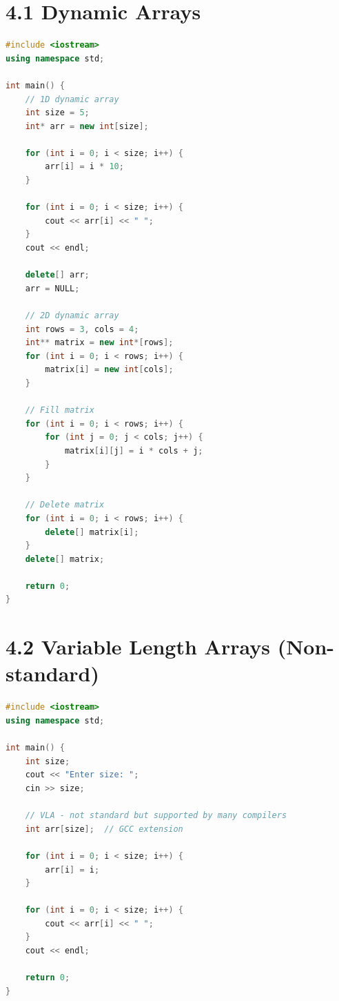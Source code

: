 \hypertarget{dynamic-arrays}{%
\section{4.1 Dynamic Arrays}\label{dynamic-arrays}}

\begin{lstlisting}[language={C++}]
#include <iostream>
using namespace std;

int main() {
    // 1D dynamic array
    int size = 5;
    int* arr = new int[size];
    
    for (int i = 0; i < size; i++) {
        arr[i] = i * 10;
    }
    
    for (int i = 0; i < size; i++) {
        cout << arr[i] << " ";
    }
    cout << endl;
    
    delete[] arr;
    arr = NULL;
    
    // 2D dynamic array
    int rows = 3, cols = 4;
    int** matrix = new int*[rows];
    for (int i = 0; i < rows; i++) {
        matrix[i] = new int[cols];
    }
    
    // Fill matrix
    for (int i = 0; i < rows; i++) {
        for (int j = 0; j < cols; j++) {
            matrix[i][j] = i * cols + j;
        }
    }
    
    // Delete matrix
    for (int i = 0; i < rows; i++) {
        delete[] matrix[i];
    }
    delete[] matrix;
    
    return 0;
}
\end{lstlisting}

\hypertarget{variable-length-arrays-non-standard}{%
\section{4.2 Variable Length Arrays
(Non-standard)}\label{variable-length-arrays-non-standard}}

\begin{lstlisting}[language={C++}]
#include <iostream>
using namespace std;

int main() {
    int size;
    cout << "Enter size: ";
    cin >> size;
    
    // VLA - not standard but supported by many compilers
    int arr[size];  // GCC extension
    
    for (int i = 0; i < size; i++) {
        arr[i] = i;
    }
    
    for (int i = 0; i < size; i++) {
        cout << arr[i] << " ";
    }
    cout << endl;
    
    return 0;
}
\end{lstlisting}

